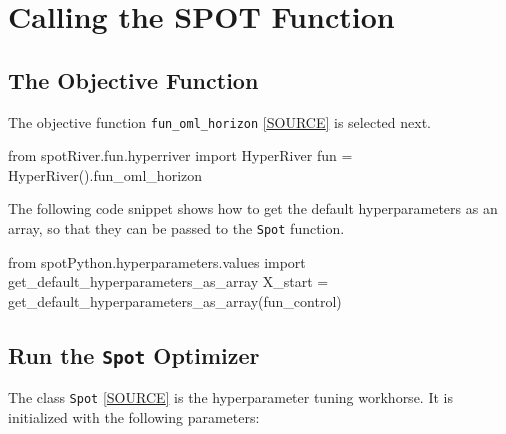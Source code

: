 \documentclass[
  letterpaper,
  DIV=11,
  numbers=noendperiod]{scrreprt}
\newenvironment{Shaded}{\begin{snugshade}}{\end{snugshade}}
\newcommand{\ImportTok}[1]{\textcolor[rgb]{0.00,0.46,0.62}{#1}}
\newcommand{\NormalTok}[1]{\textcolor[rgb]{0.00,0.23,0.31}{#1}}
\newcommand{\OperatorTok}[1]{\textcolor[rgb]{0.37,0.37,0.37}{#1}}
\begin{document}
\section{Calling the SPOT Function}\label{calling-the-spot-function}

\subsection{The Objective Function}\label{sec-the-objective-function-51}

The objective function \texttt{fun\_oml\_horizon}
\href{https://github.com/sequential-parameter-optimization/spotRiver/blob/main/src/spotRiver/fun/hyperriver.py}{{[}SOURCE{]}}
is selected next.

\begin{Shaded}
\begin{Highlighting}[]
\ImportTok{from}\NormalTok{ spotRiver.fun.hyperriver }\ImportTok{import}\NormalTok{ HyperRiver}
\NormalTok{fun }\OperatorTok{=}\NormalTok{ HyperRiver().fun\_oml\_horizon}
\end{Highlighting}
\end{Shaded}

The following code snippet shows how to get the default hyperparameters
as an array, so that they can be passed to the \texttt{Spot} function.

\begin{Shaded}
\begin{Highlighting}[]
\ImportTok{from}\NormalTok{ spotPython.hyperparameters.values }\ImportTok{import}\NormalTok{ get\_default\_hyperparameters\_as\_array}
\NormalTok{X\_start }\OperatorTok{=}\NormalTok{ get\_default\_hyperparameters\_as\_array(fun\_control)}
\end{Highlighting}
\end{Shaded}

\subsection{\texorpdfstring{Run the \texttt{Spot}
Optimizer}{Run the Spot Optimizer}}\label{run-the-spot-optimizer}

The class \texttt{Spot}
\href{https://github.com/sequential-parameter-optimization/spotPython/blob/main/src/spotPython/spot/spot.py}{{[}SOURCE{]}}
is the hyperparameter tuning workhorse. It is initialized with the
following parameters:
\end{document}
